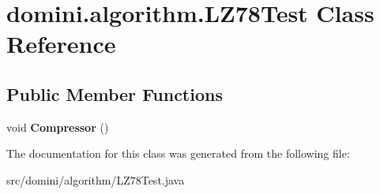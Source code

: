\hypertarget{classdomini_1_1algorithm_1_1LZ78Test}{}\section{domini.\+algorithm.\+L\+Z78\+Test Class Reference}
\label{classdomini_1_1algorithm_1_1LZ78Test}
\subsection*{Public Member Functions}
\begin{DoxyCompactItemize}
\item 
\mbox{\label{classdomini_1_1algorithm_1_1LZ78Test_ad287779f27337644762b8a68e33ea7b8}} 
void {\bfseries Compressor} ()
\end{DoxyCompactItemize}


The documentation for this class was generated from the following file\+:\begin{DoxyCompactItemize}
\item 
src/domini/algorithm/L\+Z78\+Test.\+java\end{DoxyCompactItemize}
